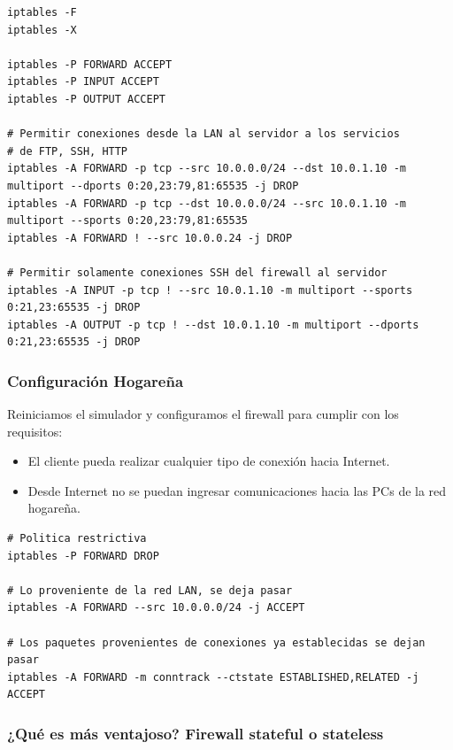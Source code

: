 \begingroup
    \fontsize{9pt}{10pt}\selectfont
\begin{lstlisting}[breaklines=true]
iptables -F
iptables -X

iptables -P FORWARD ACCEPT
iptables -P INPUT ACCEPT
iptables -P OUTPUT ACCEPT

# Permitir conexiones desde la LAN al servidor a los servicios
# de FTP, SSH, HTTP
iptables -A FORWARD -p tcp --src 10.0.0.0/24 --dst 10.0.1.10 -m multiport --dports 0:20,23:79,81:65535 -j DROP
iptables -A FORWARD -p tcp --dst 10.0.0.0/24 --src 10.0.1.10 -m multiport --sports 0:20,23:79,81:65535 
iptables -A FORWARD ! --src 10.0.0.24 -j DROP

# Permitir solamente conexiones SSH del firewall al servidor
iptables -A INPUT -p tcp ! --src 10.0.1.10 -m multiport --sports 0:21,23:65535 -j DROP
iptables -A OUTPUT -p tcp ! --dst 10.0.1.10 -m multiport --dports 0:21,23:65535 -j DROP
\end{lstlisting}
\endgroup

\subsubsection*{Configuración Hogareña}

Reiniciamos el simulador y configuramos el firewall para cumplir con los requisitos:

\begin{itemize}
    \item El cliente pueda realizar cualquier tipo de conexión hacia Internet.
    \item Desde Internet no se puedan ingresar comunicaciones hacia las PCs de la red hogareña.
\end{itemize}

\begingroup
    \fontsize{9pt}{10pt}\selectfont
\begin{lstlisting}[breaklines=true]
# Politica restrictiva
iptables -P FORWARD DROP

# Lo proveniente de la red LAN, se deja pasar
iptables -A FORWARD --src 10.0.0.0/24 -j ACCEPT

# Los paquetes provenientes de conexiones ya establecidas se dejan pasar
iptables -A FORWARD -m conntrack --ctstate ESTABLISHED,RELATED -j ACCEPT
\end{lstlisting}
\endgroup


\subsubsection*{¿Qué es más ventajoso? Firewall stateful o stateless}

